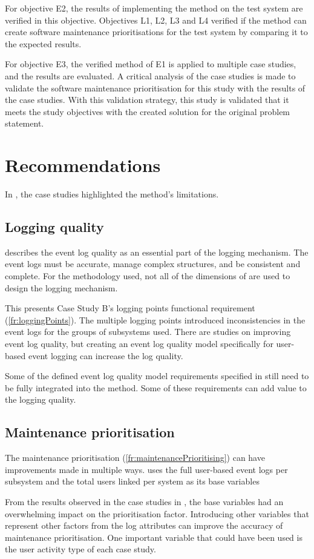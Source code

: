 For objective E2, the results of implementing the method on the test system are verified in this objective. Objectives L1, L2, L3 and L4 verified if the method can create software maintenance prioritisations for the test system by comparing it to the expected results. \par For objective E3, the verified method of E1 is applied to multiple case studies, and the results are evaluated. A critical analysis of the case studies is made to validate the software maintenance prioritisation for this study with the results of the case studies. With this validation strategy, this study is validated that it meets the study objectives with the created solution for the original problem statement.

\section{Recommendations}
In , the case studies highlighted the method's limitations. 

\subsection{Logging quality}
 describes the event log quality as an essential part of the logging mechanism. The event logs must be accurate, manage complex structures, and be consistent and complete. For the methodology used, not all of the dimensions of  are used to design the logging mechanism.\par This presents Case Study B's logging points functional requirement (\ref{fr:loggingPoints}). The multiple logging points introduced inconsistencies in the event logs for the groups of subsystems used. There are studies on improving event log quality, but creating an event log quality model specifically for user-based event logging can increase the log quality. \par Some of the defined event log quality model requirements specified in  still need to be fully integrated into the method. Some of these requirements can add value to the logging quality.

\subsection{Maintenance prioritisation}
The maintenance prioritisation (\ref{fr:maintenancePrioritising}) can have improvements made in multiple ways.  uses the full user-based event logs per subsystem and the total users linked per system as its base variables\par From the results observed in the case studies in , the base variables had an overwhelming impact on the prioritisation factor. Introducing other variables that represent other factors from the log attributes can improve the accuracy of maintenance prioritisation. One important variable that could have been used is the user activity type of each case study.

